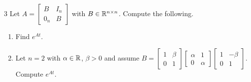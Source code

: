 \documentclass[a4paper, 11pt]{article}
\begin{document}
\begin{problem}{3}
Let $A=\begin{bmatrix} B & I_n\\ 0_n & B \end{bmatrix}$ with $B\in\mathbb{R}^{n\times n}$. Compute the following.
\begin{enumerate}
    \item Find $e^{At}$.
    \item Let $n=2$ with $\alpha\in\mathbb{R}$, $\beta>0$ and assume $B=\begin{bmatrix} 1&\beta\\ 0&1 \end{bmatrix}\begin{bmatrix} \alpha&1\\ 0&\alpha \end{bmatrix}\begin{bmatrix} 1&-\beta\\ 0&1 \end{bmatrix}$. Compute $e^{At}$.
\end{enumerate}
\end{problem}
\end{document}
